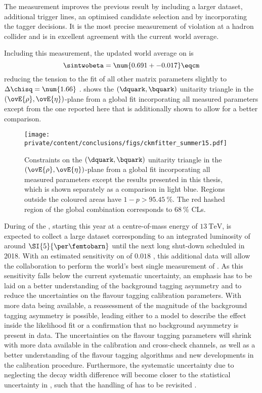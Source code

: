 The measurement improves the previous \LHCb result \cite{Aaij:1497268} by
including a larger dataset, additional trigger lines, an optimised candidate
selection and by incorporating the \SSpi tagger decisions. It is the most
precise measurement of \CP violation at a hadron collider and is in excellent
agreement with the current world average. 

Including this measurement, the updated world average on \sintwobeta
\cite{Amhis:2014hma} is
%
\begin{equation*}
  \sintwobeta = \num{0.691 +- 0.017} \eqcm
\end{equation*}
%
reducing the tension to the fit of all other \CKM matrix parameters slightly to
$\Delta\chisq = \num{1.66}$ \cite{Charles:2004jd}. 
 shows the ${(\dquark,\bquark)}$ unitarity
triangle in the ${(\ovE{\rho},\ovE{\eta})}$-plane from a global fit
incorporating all measured \CKM parameters \cite{Charles:2004jd} except from the
one reported here that is additionally shown to allow for a better comparison.
%
\begin{figure}[ht]
\centering
\texttt{[image: private/content/conclusions/figs/ckmfitter\_summer15.pdf]}
\caption{Constraints on the ${(\dquark,\bquark)}$ unitarity triangle in the
${(\ovE{\rho},\ovE{\eta})}$-plane from a global fit incorporating all measured
\CKM parameters except the results presented in this thesis, which is shown
separately as a comparison in light blue. Regions outside the coloured areas
have $1-p > \SI{95.45}{\percent}$. The red hashed region of the global
combination corresponds to $\SI{68}{\percent}$ \acp{CL}. \cite{Charles:2004jd}}
\label{fig:conclusion:ckm_fitter_15}
\end{figure}

During \RunTwo of the \LHC, starting this year at a centre-of-mass energy of
$\SI{13}{\TeV}$, \LHCb is expected to collect a large dataset corresponding to
an integrated luminosity of around $\SI{5}{\per\femtobarn}$ until the next long
shut-down scheduled in 2018. With an estimated sensitivity on \SJpsiKS of
$\num{0.018}$ \cite{Moedden:2015}, this additional data will allow the \LHCb
collaboration to perform the world's best single measurement of \sintwobeta. As
this sensitivity falls below the current systematic uncertainty, an emphasis has
to be laid on a better understanding of the background tagging asymmetry and to
reduce the uncertainties on the flavour tagging calibration parameters. With
more data being available, a reassessment of the magnitude of the background
tagging asymmetry is possible, leading either to a model to describe the effect
inside the likelihood fit or a confirmation that no background asymmetry is
present in data. The uncertainties on the flavour tagging parameters will shrink
with more data available in the calibration and cross-check channels, as well as
a better understanding of the flavour tagging algorithms and new developments in
the calibration procedure. Furthermore, the systematic uncertainty due to
neglecting the decay width difference \DGd will become closer to the statistical
uncertainty in \RunTwo, such that the handling of \DGd has to be revisited
\cite{Moedden:2015}.

